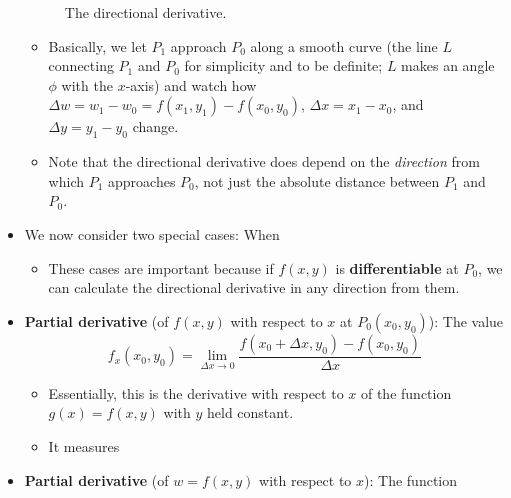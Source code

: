 \documentclass[../main.tex]{subfiles}
\begin{document}
\begin{itemize}
\begin{figure}[h!]
        \caption{The directional derivative.}
        \label{fig:directionalDerivative}
    \end{figure}
    \begin{itemize}
        \item Basically, we let $P_1$ approach $P_0$ along a smooth curve (the line $L$ connecting $P_1$ and $P_0$ for simplicity and to be definite; $L$ makes an angle $\phi$ with the $x$-axis) and watch how $\Delta w=w_1-w_0=f(x_1,y_1)-f(x_0,y_0)$, $\Delta x=x_1-x_0$, and $\Delta y=y_1-y_0$ change.
        \item Note that the directional derivative does depend on the \emph{direction} from which $P_1$ approaches $P_0$, not just the absolute distance between $P_1$ and $P_0$.
    \end{itemize}
    \item We now consider two special cases: When 
    \begin{itemize}
        \item These cases are important because if $f(x,y)$ is \textbf{differentiable} at $P_0$, we can calculate the directional derivative in any direction from them.
    \end{itemize}
    \item \textbf{Partial derivative} (of $f(x,y)$ with respect to $x$ at $P_0(x_0,y_0)$): The value
    \begin{equation*}
        f_x(x_0,y_0) = \lim_{\Delta x\to 0}\frac{f(x_0+\Delta x,y_0)-f(x_0,y_0)}{\Delta x}
    \end{equation*}
    \begin{itemize}
        \item Essentially, this is the derivative with respect to $x$ of the function $g(x)=f(x,y)$ with $y$ held constant.
        \item It measures 
    \end{itemize}
    \item \textbf{Partial derivative} (of $w=f(x,y)$ with respect to $x$): The function

\end{itemize}
\end{document}
